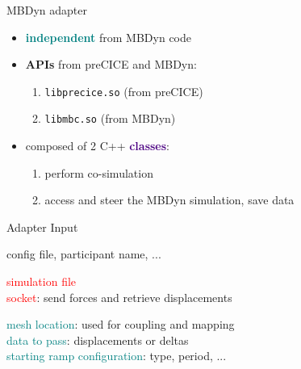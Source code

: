 \documentclass[10pt,t]{beamer}
\begin{document}
\begin{frame}{MBDyn adapter}
    
    \begin{itemize}
     \itemsep 8pt
        \item \textcolor{teal}{\textbf{independent}} from MBDyn code
        \item \textcolor{dblue}{\textbf{APIs}} from preCICE and MBDyn:
        \begin{enumerate}
            \itemsep 5pt
            \item \texttt{libprecice.so}   \hspace{0.6cm} (from preCICE)
            \item \texttt{libmbc.so}       \hspace{1.27cm}    (from MBDyn)
        \end{enumerate}
        
        \item composed of 2 C++ \textcolor{indigo}{\textbf{classes}}:
        \begin{enumerate}
            \itemsep 5pt
            \item perform co-simulation
            \item access and steer the MBDyn simulation, save data
        \end{enumerate}
        
    \end{itemize}
\end{frame}

\begin{frame}{Adapter Input}
  \vspace{1.0cm}
  \begin{description}[Simulation]
  \itemsep 10pt
  \item[preCICE] \textcolor{dorange}{config file, participant name, ...}
  \item[MBDyn]      \textcolor{red}{simulation file} \\
                    \textcolor{red}{socket}: send forces and retrieve displacements \\
  \item[Simulation] \textcolor{teal}{mesh location}: used for coupling and mapping\\
                    \textcolor{teal}{data to pass}: displacements or deltas\\
                    \textcolor{teal}{starting ramp configuration}: type, period, ...
  \end{description}


\end{frame}
\end{document}
